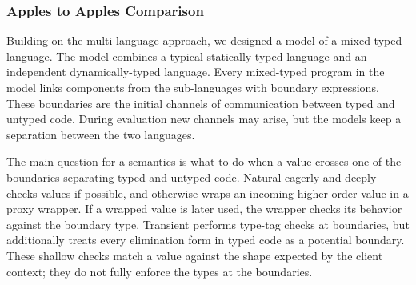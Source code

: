 

\subsubsection{Apples to Apples Comparison}


Building on the \citet{mf-toplas-2009} multi-language approach, we designed
 a model of a mixed-typed language.
The model combines a typical statically-typed language and an independent
 dynamically-typed language.
Every mixed-typed program in the model links components from the sub-languages
 with boundary expressions.
These boundaries are the initial channels of communication between typed and
 untyped code.
During evaluation new channels may arise, but the models keep a separation
 between the two languages.

The main question for a semantics is what to do when a value crosses one
 of the boundaries separating typed and untyped code.
Natural eagerly and deeply checks values if possible, and otherwise wraps
 an incoming higher-order value in a proxy wrapper.
If a wrapped value is later used, the wrapper checks its behavior against
 the boundary type.
Transient performs type-tag checks at boundaries, but additionally
 treats every elimination form in typed code as a potential boundary.
These shallow checks match a value against the shape expected by the
 client context; they do not fully enforce the types at the boundaries.


